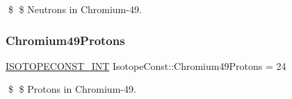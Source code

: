 \$ \$ Neutrons in Chromium-\/49. \mbox{\label{group___isotope_const-_chromium-_cr49_ga3e2f0d13e72da3396ce70f63b7a18514}} 
\subsubsection{\texorpdfstring{Chromium49\+Protons}{Chromium49Protons}}
{\footnotesize\ttfamily \mbox{\hyperlink{group___isotope_const-_macros_ga5f18360b3e99483a35c32d789e62621c}{I\+S\+O\+T\+O\+P\+E\+C\+O\+N\+S\+T\+\_\+\+I\+NT}} Isotope\+Const\+::\+Chromium49\+Protons = 24}

\$ \$ Protons in Chromium-\/49. 
